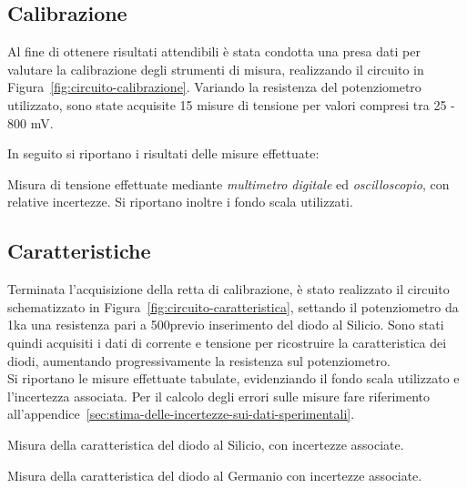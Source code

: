 \documentclass[@MAIN@]{subfiles}
\begin{document}
    \subsection*{Calibrazione}
    Al fine di ottenere risultati attendibili è stata condotta una presa dati per valutare la
    calibrazione degli strumenti di misura, realizzando il circuito in Figura~\ref{fig:circuito-calibrazione}. Variando
    la resistenza del potenziometro utilizzato, sono state acquisite 15 misure di tensione per valori compresi tra 25 - 800 mV. \newline

    \noindent In seguito si riportano i risultati delle misure effettuate: \\

    \begin{table}[ht]
        \centering
        
        \caption{Misura di tensione effettuate mediante \textit{multimetro digitale} ed \textit{oscilloscopio},
            con relative incertezze. Si riportano inoltre i fondo scala utilizzati.}
        \label{tab:calibrazione}
    \end{table}
    \vspace{-0.1cm}

    \subsection*{Caratteristiche}
    Terminata l'acquisizione della retta di calibrazione, è stato realizzato il circuito schematizzato
    in Figura~\ref{fig:circuito-caratteristica}, settando il potenziometro da 1k\textohm  a una resistenza pari
    a 500\textohm  previo inserimento del diodo al Silicio. Sono stati quindi acquisiti i dati di corrente e
    tensione per ricostruire la caratteristica dei diodi, aumentando
    progressivamente la resistenza sul potenziometro. \\

    Si riportano le misure effettuate tabulate, evidenziando il fondo
    scala utilizzato e l'incertezza associata. Per il calcolo degli errori sulle misure fare riferimento
    all'appendice~\ref{sec:stima-delle-incertezze-sui-dati-sperimentali}.\newline


    \begin{table}[!ht]
        \centering
        
        \captionsetup{justification=centering} %
        \caption{Misura della caratteristica del diodo al Silicio, con incertezze associate.}
        \label{tab:silicio}

    \end{table}

    \vspace{1.5pt}
    \begin{table}[!ht]
        \centering
        
        \captionsetup{justification=centering} %
        \caption{Misura della caratteristica del diodo al Germanio con incertezze associate.}
        \label{tab:germanio}
    \end{table}
\end{document}
